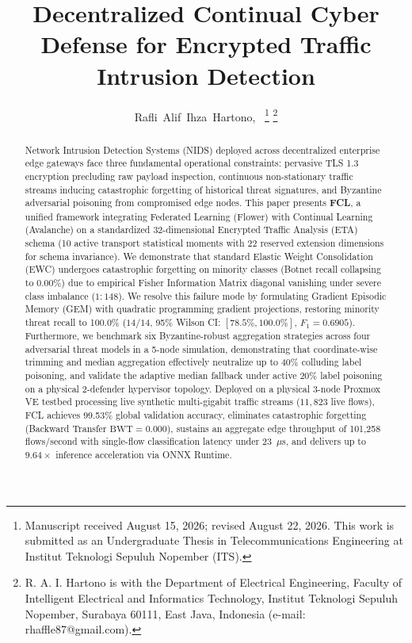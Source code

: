 \documentclass[journal,10pt,twocolumn]{IEEEtran}
\begin{document}
\title{Decentralized Continual Cyber Defense for Encrypted Traffic Intrusion Detection}

\author{Rafli~Alif~Ihza~Hartono,~
\thanks{Manuscript received August 15, 2026; revised August 22, 2026. This work is submitted as an Undergraduate Thesis in Telecommunications Engineering at Institut Teknologi Sepuluh Nopember (ITS).}
\thanks{R. A. I. Hartono is with the Department of Electrical Engineering, Faculty of Intelligent Electrical and Informatics Technology, Institut Teknologi Sepuluh Nopember, Surabaya 60111, East Java, Indonesia (e-mail: rhaffle87@gmail.com).}
}

\maketitle

\begin{abstract}
Network Intrusion Detection Systems (NIDS) deployed across decentralized enterprise edge gateways face three fundamental operational constraints: pervasive TLS 1.3 encryption precluding raw payload inspection, continuous non-stationary traffic streams inducing catastrophic forgetting of historical threat signatures, and Byzantine adversarial poisoning from compromised edge nodes. This paper presents \textbf{FCL}, a unified framework integrating Federated Learning (Flower) with Continual Learning (Avalanche) on a standardized 32-dimensional Encrypted Traffic Analysis (ETA) schema (10 active transport statistical moments with 22 reserved extension dimensions for schema invariance). We demonstrate that standard Elastic Weight Consolidation (EWC) undergoes catastrophic forgetting on minority classes (Botnet recall collapsing to 0.00\%) due to empirical Fisher Information Matrix diagonal vanishing under severe class imbalance ($1:148$). We resolve this failure mode by formulating Gradient Episodic Memory (GEM) with quadratic programming gradient projections, restoring minority threat recall to 100.0\% ($14/14$, 95\% Wilson CI: $[78.5\%, 100.0\%]$, $F_1 = 0.6905$). Furthermore, we benchmark six Byzantine-robust aggregation strategies across four adversarial threat models in a 5-node simulation, demonstrating that coordinate-wise trimming and median aggregation effectively neutralize up to 40\% colluding label poisoning, and validate the adaptive median fallback under active 20\% label poisoning on a physical 2-defender hypervisor topology. Deployed on a physical 3-node Proxmox VE testbed processing live synthetic multi-gigabit traffic streams ($11{,}823$ live flows), FCL achieves 99.53\% global validation accuracy, eliminates catastrophic forgetting (Backward Transfer $\text{BWT} = 0.000$), sustains an aggregate edge throughput of 101,258 flows/second with single-flow classification latency under 23~$\mu$s, and delivers up to $9.64\times$ inference acceleration via ONNX Runtime.
\end{abstract}
\end{document}
